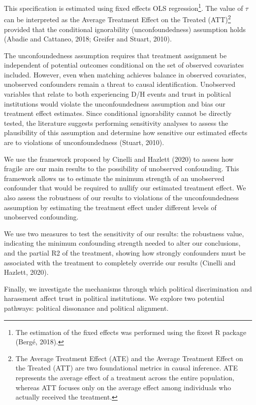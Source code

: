 \documentclass{article}
\begin{document}
This specification is estimated using fixed effects OLS regression\footnote{The estimation of the fixed effects was performed using the fixest R package (Bergé, 2018).}. The value of \( \tau \) can be interpreted as the Average Treatment Effect on the Treated (ATT)\footnote{The Average Treatment Effect (ATE) and the Average Treatment Effect on the Treated (ATT) are two foundational metrics in causal inference. ATE represents the average effect of a treatment across the entire population, whereas ATT focuses only on the average effect among individuals who actually received the treatment.} provided that the conditional ignorability (unconfoundedness) assumption holds (Abadie and Cattaneo, 2018; Greifer and Stuart, 2010).

The unconfoundedness assumption requires that treatment assignment be independent of potential outcomes conditional on the set of observed covariates included. However, even when matching achieves balance in observed covariates, unobserved confounders remain a threat to causal identification. Unobserved variables that relate to both experiencing D/H events and trust in political institutions would violate the unconfoundedness assumption and bias our treatment effect estimates. Since conditional ignorability cannot be directly tested, the literature suggests performing sensitivity analyses to assess the plausibility of this assumption and determine how sensitive our estimated effects are to violations of unconfoundedness (Stuart, 2010).

We use the framework proposed by Cinelli and Hazlett (2020) to assess how fragile are our main results to the possibility of unobserved confounding. This framework allows us to estimate the minimum strength of an unobserved confounder that would be required to nullify our estimated treatment effect. We also assess the robustness of our results to violations of the unconfoundedness assumption by estimating the treatment effect under different levels of unobserved confounding.

We use two measures to test the sensitivity of our results: the robustness value, indicating the minimum confounding strength needed to alter our conclusions, and the partial R2 of the treatment, showing how strongly confounders must be associated with the treatment to completely override our results (Cinelli and Hazlett, 2020).

Finally, we investigate the mechanisms through which political discrimination and harassment affect trust in political institutions. We explore two potential pathways: political dissonance and political alignment.
\end{document}
